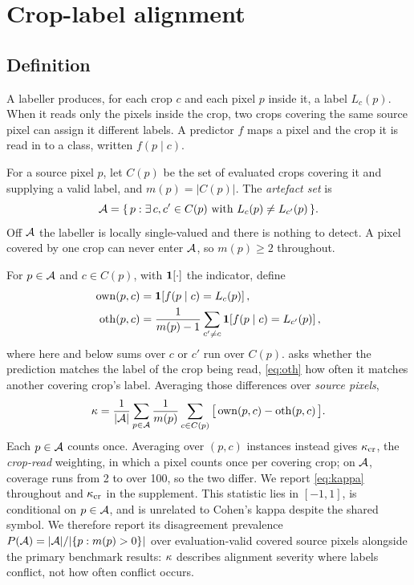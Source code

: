 \section{Crop-label alignment}
\label{sec:kappa}

\subsection{Definition}

A labeller produces, for each crop $c$ and each pixel $p$ inside it, a label
$L_c(p)$. When it reads only the pixels inside the crop, two crops covering the same
source pixel can assign it different labels. A predictor $f$ maps a pixel and the
crop it is read in to a class, written $f(p \mid c)$.

For a source pixel $p$, let $C(p)$ be the set of evaluated crops covering it and
supplying a valid label, and
$m(p) = |C(p)|$. The \emph{artefact set} is
\begin{equation}
\mathcal{A} = \{\, p : \exists\, c, c' \in C(p) \text{ with } L_c(p) \neq L_{c'}(p) \,\}.
\label{eq:aset}
\end{equation}
Off $\mathcal{A}$ the labeller is locally single-valued and there is nothing to detect. A
pixel covered by one crop can never enter $\mathcal{A}$, so $m(p) \geq 2$ throughout.

For $p \in \mathcal{A}$ and $c \in C(p)$, with $\mathbf{1}\!\left[ \cdot \right]$ the indicator, define
\begin{align}
\mathrm{own}(p,c) &= \mathbf{1}\!\left[ f(p \mid c) = L_c(p) \right], \label{eq:own}\\
\mathrm{oth}(p,c) &= \frac{1}{m(p)-1} \sum_{c' \neq c} \mathbf{1}\!\left[ f(p \mid c) = L_{c'}(p) \right],
\label{eq:oth}
\end{align}
where here and below sums over $c$ or $c'$ run over $C(p)$.  asks
whether the prediction matches the label of the crop being read, \cref{eq:oth} how
often it matches another covering crop's label. Averaging those differences over
\emph{source pixels},
\begin{equation}
\kappa = \frac{1}{|\mathcal{A}|} \sum_{p \in \mathcal{A}} \frac{1}{m(p)}
       \sum_{c \in C(p)} \big[\, \mathrm{own}(p,c) - \mathrm{oth}(p,c) \,\big].
\label{eq:kappa}
\end{equation}
Each $p \in \mathcal{A}$ counts once. Averaging over $(p,c)$ instances instead gives
$\kappa_{\mathrm{cr}}$, the \emph{crop-read} weighting, in which a pixel counts once per covering
crop; on $\mathcal{A}$, coverage runs from 2 to over 100, so the two differ. We report
\cref{eq:kappa} throughout and $\kappa_{\mathrm{cr}}$ in the supplement. This statistic lies in
$[-1,1]$, is conditional on $p\in\mathcal{A}$, and is unrelated to Cohen's kappa despite the
shared symbol. We therefore report its disagreement prevalence
$P(\mathcal{A})=|\mathcal{A}|/|\{p:m(p)>0\}|$ over evaluation-valid covered source pixels alongside
the primary benchmark results: $\kappa$ describes alignment severity where labels
conflict, not how often conflict occurs.

